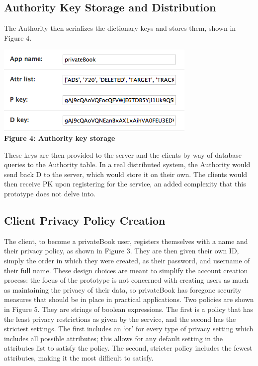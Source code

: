 \documentclass[12pt]{article}
\begin{document}
\subsection{Authority Key Storage and Distribution}
The Authority then serializes the dictionary keys and stores them, shown in Figure 4. \\
\begin{center}
\includegraphics[scale=.9]{authoritydb.png} \\
\textbf{Figure 4: Authority key storage}
\end{center}
These keys are then provided to the server and the clients by way of database queries to the Authority table. In a real distributed system, the Authority would send back D to the server, which would store it on their own. The clients would then receive PK upon registering for the service, an added complexity that this prototype does not delve into. 

\subsection{Client Privacy Policy Creation}
The client, to become a privateBook user, registers themselves with a name and their privacy policy, as shown in Figure 3. They are then given their own ID, simply the order in which they were created, as their password, and username of their full name. These design choices are meant to simplify the account creation process: the focus of the prototype is not concerned with creating users as much as maintaining the privacy of their data, so privateBook has foregone security measures that should be in place in practical applications. Two policies are shown in Figure 5. They are strings of boolean expressions. The first is a policy that has the least privacy restrictions as given by the service, and the second has the strictest settings. The first includes an `or' for every type of privacy setting which includes all possible attributes; this allows for any default setting in the attributes list to satisfy the policy. The second, stricter policy includes the fewest attributes, making it the most difficult to satisfy.
\end{document}

